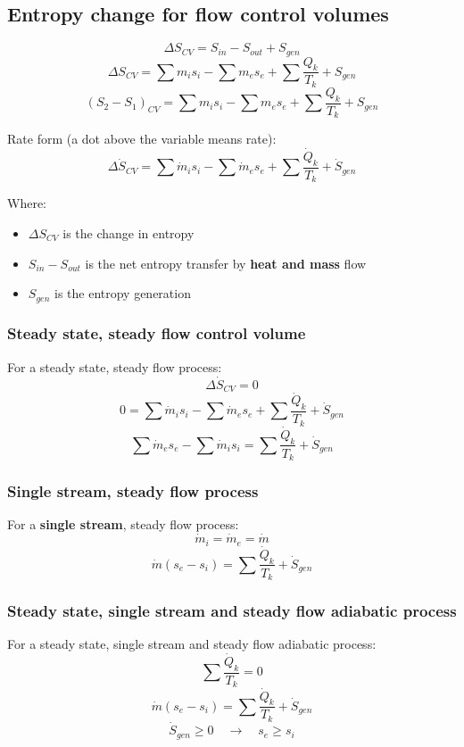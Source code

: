 \documentclass[11pt]{article}
\begin{document}
\subsection{Entropy change for flow control volumes}
\label{sec:org308df84}
\[\Delta S_{CV} = S_{in} - S_{out} + S_{gen}\]
\[\Delta S_{CV} = \sum m_i s_i - \sum m_e s_e + \sum \frac{Q_k}{T_k} + S_{gen}\]
\[(S_2 - S_1)_{CV} = \sum m_i s_i - \sum m_e s_e + \sum \frac{Q_k}{T_k} + S_{gen}\]

Rate form (a dot above the variable means rate):
\[\Delta \dot{S}_{CV} = \sum \dot{m}_i s_i - \sum \dot{m}_e s_e + \sum \frac{\dot{Q}_k}{T_k} + \dot{S}_{gen}\]

Where:
\begin{itemize}
\item \(\Delta S_{CV}\) is the change in entropy
\item \(S_{in} - S_{out}\) is the net entropy transfer by \textbf{heat and mass} flow
\item \(S_{gen}\) is the entropy generation
\end{itemize}

\subsubsection{Steady state, steady flow control volume}
\label{sec:org91de619}
For a steady state, steady flow process:
\[\Delta \dot{S}_{CV} = 0\]
\[0 = \sum \dot{m}_i s_i - \sum \dot{m}_e s_e + \sum \frac{\dot{Q}_k}{T_k} + \dot{S}_{gen}\]
\[\sum \dot{m}_e s_e - \sum \dot{m}_i s_i = \sum \frac{\dot{Q}_k}{T_k} + \dot{S}_{gen}\]

\subsubsection{Single stream, steady flow process}
\label{sec:org96c94f6}
For a \textbf{single stream}, steady flow process:
\[\dot{m}_i = \dot{m}_e = \dot{m}\]
\[\dot{m} (s_e - s_i) = \sum \frac{\dot{Q}_k}{T_k} + \dot{S}_{gen}\]

\subsubsection{Steady state, single stream and steady flow adiabatic process}
\label{sec:org9b7c7ca}
For a steady state, single stream and steady flow adiabatic process:
\[\sum \frac{\dot{Q}_k}{T_k} = 0\]
\[\dot{m} (s_e - s_i) = \sum \frac{\dot{Q}_k}{T_k} + \dot{S}_{gen}\]
\[\dot{S}_{gen} \ge 0 \quad \rightarrow \quad s_e \ge s_i\]
\end{document}

